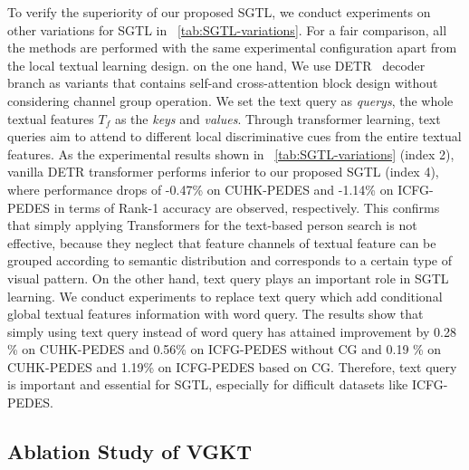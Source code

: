 To verify the superiority of our proposed SGTL, we conduct experiments on other variations for SGTL in \tablename~\ref{tab:SGTL-variations}.
For a fair comparison, all the methods are performed with the same experimental configuration apart from the local textual learning design.
on the one hand,
We use DETR~\cite{detr} decoder branch as variants that contains self-and cross-attention block design without considering channel group operation. We set the text query as \textit{querys}, the whole textual features $T_f$ as the \textit{keys} and \textit{values}. Through transformer learning, text queries aim to attend to different local discriminative cues from the entire textual features.
As the experimental results shown in \tablename~\ref{tab:SGTL-variations} (index 2), vanilla DETR transformer performs inferior to our proposed SGTL (index 4), where performance drops of -0.47\% on CUHK-PEDES and -1.14\% on ICFG-PEDES in terms of Rank-1 accuracy are observed, respectively. This confirms that simply applying Transformers for the text-based person search is not effective, because they neglect that feature channels
of textual feature can be grouped according to semantic
distribution and corresponds to a certain type of visual pattern.
On the other hand, text query plays an important role in SGTL learning. We conduct experiments to replace text query which add conditional global textual features information with word query. The results show that simply using text query instead of word query has attained improvement by 0.28 \% on CUHK-PEDES and 0.56\% on ICFG-PEDES without CG and 0.19 \% on CUHK-PEDES and 1.19\% on ICFG-PEDES based on CG. Therefore, text query is important and essential for SGTL, especially for difficult datasets like ICFG-PEDES.




\subsection{Ablation Study of VGKT}

